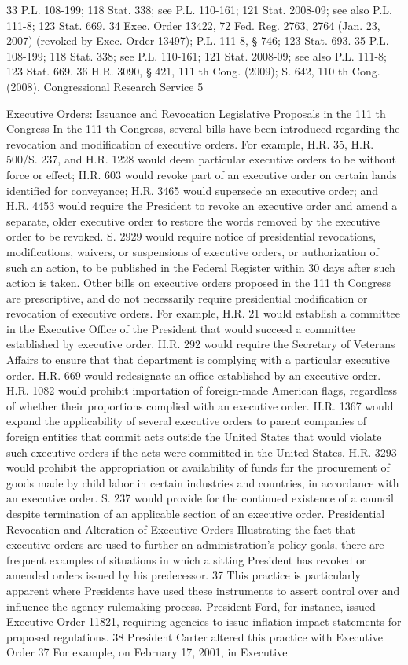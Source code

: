 \documentclass[11pt,a4paper]{article}
\begin{document}
33 P.L. 108-199; 118 Stat. 338; see P.L. 110-161; 121 Stat. 2008-09; see also P.L. 111-8; 123 Stat. 669. 34 Exec. Order 13422, 72 Fed. Reg. 2763, 2764 (Jan. 23, 2007) (revoked by Exec. Order 13497); P.L. 111-8, § 746; 123 Stat. 693. 35 P.L. 108-199; 118 Stat. 338; see P.L. 110-161; 121 Stat. 2008-09; see also P.L. 111-8; 123 Stat. 669. 36 H.R. 3090, § 421, 111 th Cong. (2009); S. 642, 110 th Cong. (2008). Congressional Research Service 5

Executive Orders: Issuance and Revocation Legislative Proposals in the 111 th Congress In the 111 th Congress, several bills have been introduced regarding the revocation and modification of executive orders. For example, H.R. 35, H.R. 500/S. 237, and H.R. 1228 would deem particular executive orders to be without force or effect; H.R. 603 would revoke part of an executive order on certain lands identified for conveyance; H.R. 3465 would supersede an executive order; and H.R. 4453 would require the President to revoke an executive order and amend a separate, older executive order to restore the words removed by the executive order to be revoked. S. 2929 would require notice of presidential revocations, modifications, waivers, or suspensions of executive orders, or authorization of such an action, to be published in the Federal Register within 30 days after such action is taken. Other bills on executive orders proposed in the 111 th Congress are prescriptive, and do not necessarily require presidential modification or revocation of executive orders. For example, H.R. 21 would establish a committee in the Executive Office of the President that would succeed a committee established by executive order. H.R. 292 would require the Secretary of Veterans Affairs to ensure that that department is complying with a particular executive order. H.R. 669 would redesignate an office established by an executive order. H.R. 1082 would prohibit importation of foreign-made American flags, regardless of whether their proportions complied with an executive order. H.R. 1367 would expand the applicability of several executive orders to parent companies of foreign entities that commit acts outside the United States that would violate such executive orders if the acts were committed in the United States. H.R. 3293 would prohibit the appropriation or availability of funds for the procurement of goods made by child labor in certain industries and countries, in accordance with an executive order. S. 237 would provide for the continued existence of a council despite termination of an applicable section of an executive order. Presidential Revocation and Alteration of Executive Orders Illustrating the fact that executive orders are used to further an administration's policy goals, there are frequent examples of situations in which a sitting President has revoked or amended orders issued by his predecessor. 37 This practice is particularly apparent where Presidents have used these instruments to assert control over and influence the agency rulemaking process. President Ford, for instance, issued Executive Order 11821, requiring agencies to issue inflation impact statements for proposed regulations. 38 President Carter altered this practice with Executive Order 37 For example, on February 17, 2001, in Executive 
\end{document}
